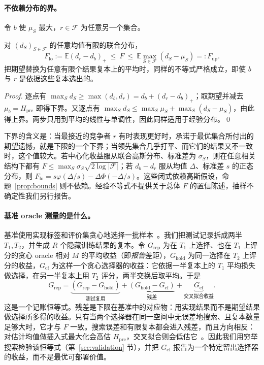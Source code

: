 \documentclass[runningheads]{llncs}
\newcommand{\Hpre}{H_{\mathrm{pre}}}
\begin{document}
\paragraph{不依赖分布的界。}令 $b$ 使 $\mu_S$ 最大，$r\in\mathcal F$ 为任意另一个集合。
\begin{mprop}\label{prop:bounds}
对 $(d_S)_{S\in\mathcal F}$ 的任意均值有限的联合分布，
\begin{equation}
 F_{\mathrm{lo}}:=\mathbb E(d_r-d_b)_+\ \le\ F\ \le\ \mathbb E\max_{S\in\mathcal F}(d_S-\mu_S)=:F_{\mathrm{up}} .\label{eq:bounds}
\end{equation}
把期望替换为任意有限个结果复本上的平均时，同样的不等式严格成立，即使 $b$ 与 $r$ 是依据这些复本选出的。
\end{mprop}
\begin{proof}
逐点有 $\max_S d_S\ge\max(d_b,d_r)=d_b+(d_r-d_b)_+$；取期望并减去 $\mu_b=\Hpre$ 即得下界。又逐点有 $\max_S d_S\le\max_S\mu_S+\max_S(d_S-\mu_S)$，由此得上界。两步只用到平均的线性与单调性，因此同样适用于经验分布。\qed
\end{proof}
下界的含义是：当最接近的竞争者 $r$ 有时表现更好时，承诺于最优集合所付出的期望遗憾，就是下限的一个下界；当领先集合几乎打平、而它们的结果又不一致时，这个值较大。若中心化收益服从联合高斯分布、标准差为 $\sigma_S$，则在任意相关结构下都有 $F\le\max_S\sigma_S\sqrt{2\log|\mathcal F|}$；若 $d_b-d_r$ 服从均值 $\Delta$、标准差 $s$ 的正态分布，则 $F_{\mathrm{lo}}=s\varphi(\Delta/s)-\Delta\Phi(-\Delta/s)$。这些闭式依赖高斯假设，命题~\ref{prop:bounds} 则不依赖。经验不等式不提供关于总体 $F$ 的置信陈述，抽样不确定性我们另行报告。

\paragraph{基准 oracle 测量的是什么。}基准使用实现标签和评价集贪心地选择一批样本~\cite{werner2023comparable,werner2024cdalbench}。我们把测试记录拆成两半 $T_1,T_2$，并生成 $R$ 个隐藏训练结果的复本。令 $G_{\mathrm{rep}}$ 为在 $T_1$ 上选择、也在 $T_1$ 上评分的贪心 oracle 相对 $M$ 的平均收益（即\emph{报告}差距），$G_{\mathrm{hold}}$ 为同一选择在 $T_2$ 上评分的收益，$G_{\mathrm{cf}}$ 为这样一个贪心选择器的收益：它依据一半复本上的 $T_1$ 平均损失做选择，在另一半复本上用 $T_2$ 评分，两半交换后取平均。于是
\begin{equation}
 G_{\mathrm{rep}}=\underbrace{(G_{\mathrm{rep}}-G_{\mathrm{hold}})}_{\text{测试复用}}+\underbrace{(G_{\mathrm{hold}}-G_{\mathrm{cf}})}_{\text{残差}}+\underbrace{G_{\mathrm{cf}}}_{\text{交叉拟合收益}} .\label{eq:greedy}
\end{equation}
这是一个记账恒等式。残差是下限在基准中的对应物：用实现结果而不是期望结果做选择所多得的收益。只有当两个选择器在同一空间中无误差地搜索、且复本数量足够大时，它才与 $F$ 一致。搜索误差和有限复本都会进入残差，而且方向相反：对估计均值做插入式最大化会高估 $\Hpre$，交叉拟合则会低估它~\cite{smith2006optimizer,cawley2010overfitting}。因此我们用穷举搜索检验该恒等式（第~\ref{sec:validation} 节），并把 $G_{\mathrm{cf}}$ 报告为一个特定留出选择器的收益，而不是最优可部署价值。
\end{document}
